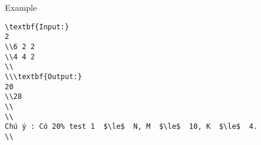 Example
\begin{verbatim}
\textbf{Input:}
2
\\6 2 2
\\4 4 2
\\
\\\textbf{Output:}
20
\\28 
\\
\\
Chú ý : Có 20% test 1  $\le$  N, M  $\le$  10, K  $\le$  4.
\\\end{verbatim}